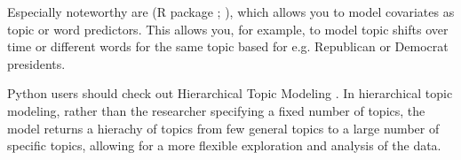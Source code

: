 Especially noteworthy are  (R package ; \cite*{stm}),
which allows you to model covariates as topic or word predictors.
This allows you, for example, to model topic shifts over time or
different words for the same topic based for e.g. Republican or Democrat presidents. 

Python users should check out Hierarchical Topic Modeling \citep{hierarchicallda}.
In hierarchical topic modeling, rather than the researcher specifying a fixed number of topics,
the model returns a hierachy of topics from few general topics to a large number of specific topics,
allowing for a more flexible exploration and analysis of the data. 


